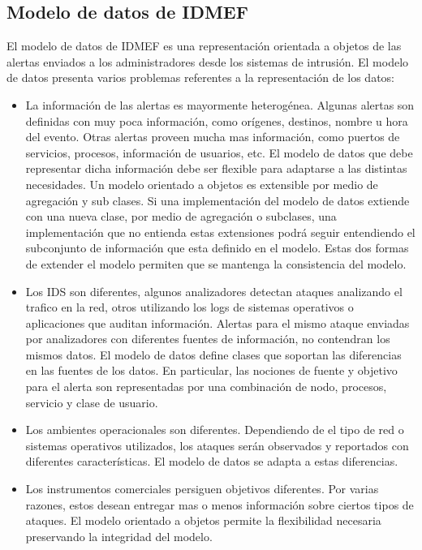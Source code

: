 \subsection{Modelo de datos de IDMEF}
El modelo de datos de IDMEF es una representación orientada a objetos de las 
alertas enviados a los administradores desde los sistemas de intrusión.
El modelo de datos presenta varios problemas referentes a la representación de 
los datos:
\begin{itemize}
  \item La información de las alertas es mayormente heterogénea. Algunas alertas son 
  definidas con muy poca información, como orígenes, destinos, nombre u hora del 
  evento. Otras alertas proveen mucha mas información, como puertos de 
  servicios, procesos, información de usuarios, etc. El modelo de datos que debe 
  representar dicha información debe ser flexible para adaptarse a las distintas 
  necesidades. Un modelo orientado a objetos es extensible por medio de 
  agregación y sub clases. Si una implementación del modelo de datos extiende 
  con una nueva clase, por medio de agregación o subclases, una implementación 
  que no entienda estas extensiones podrá seguir entendiendo el subconjunto de 
  información que esta definido en el modelo. Estas dos formas de extender el 
  modelo permiten que se mantenga la consistencia del modelo.
  \item Los IDS son diferentes, algunos analizadores detectan ataques analizando 
  el trafico en la red, otros utilizando los logs de sistemas operativos o 
  aplicaciones que auditan información. Alertas para el mismo ataque enviadas 
  por analizadores con diferentes fuentes de información, no contendran los 
  mismos datos.
  El modelo de datos define clases que soportan las diferencias en las fuentes 
  de los datos. En particular, las nociones de fuente y objetivo para el alerta 
  son representadas por una combinación de nodo, procesos, servicio y clase de 
  usuario.
  \item Los ambientes operacionales son diferentes. Dependiendo de el tipo de 
  red o sistemas operativos utilizados, los ataques serán observados y 
  reportados con diferentes características. El modelo de datos se 
  adapta a estas diferencias.
  \item Los instrumentos comerciales persiguen objetivos diferentes. Por varias 
  razones, estos desean entregar mas o menos información sobre ciertos tipos de 
  ataques. El modelo orientado a objetos permite la flexibilidad necesaria 
  preservando la integridad del modelo.
\end{itemize}

